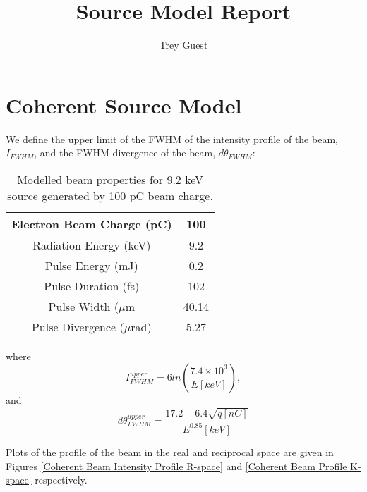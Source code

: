 \documentclass[]{scrartcl}
\title{Source Model Report}
\author{Trey Guest}
\begin{document}
\maketitle

\begin{abstract}

\end{abstract}
\pagebreak


\section{Coherent Source Model}

 
We define the upper limit of the FWHM of the intensity profile of the beam, $I_{FWHM}$, and the FWHM divergence of the beam, $d\theta_{FWHM}$:

\begin{table}[H]
	\caption{Modelled beam properties for 9.2 keV source generated by 100 pC beam charge.}
	\begin{center}
		\begin{tabular}{|c|c|}
			\hline 
			Electron Beam Charge (pC) & 100 \\ 
			\hline 
			Radiation Energy (keV) & 9.2 \\ 
			\hline 
			Pulse Energy (mJ) & 0.2 \\ 
			\hline 
			Pulse Duration (fs) & 102 \\ 
			\hline 
			Pulse Width ($\mu$m & 40.14 \\ 
			\hline 
			Pulse Divergence ($\mu$rad) & 5.27 \\ 
			\hline 
			
			
		\end{tabular}
	\end{center}
	
\end{table}
where
\begin{equation}\label{Eqn: FWHM upper limit}
	I_{FWHM}^{upper} = 6ln\left(\frac{7.4\times10^{3}}{E[keV]}\right),
\end{equation}
 \indent and
\begin{equation}\label{Eqn: Divergence upper limit}
	d\theta_{FWHM}^{upper} = \frac{17.2-6.4\sqrt{q[nC]}}{E^{0.85}[keV]}
\end{equation}

\noindent Plots of the profile of the beam in the real and reciprocal space are given in Figures \ref{Coherent Beam Intensity Profile R-space} and \ref{Coherent Beam Profile K-space} respectively.
\end{document}
